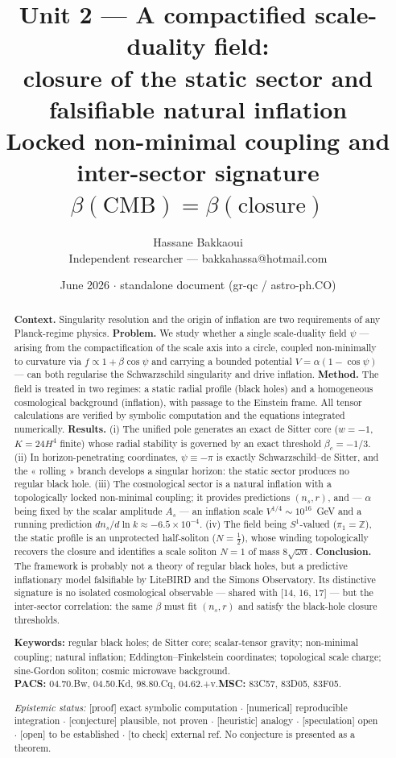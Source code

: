\documentclass[11pt,a4paper]{article}
\title{\vspace{-1.0cm}\textbf{Unit 2 --- A compactified scale-duality field:\\
closure of the static sector and falsifiable natural inflation}\\[5pt]
\large Locked non-minimal coupling and inter-sector signature $\beta(\mathrm{CMB})=\beta(\text{closure})$}
\author{Hassane Bakkaoui\\ \small Independent researcher --- bakkahassa@hotmail.com}
\date{\small June 2026 $\cdot$ standalone document (gr-qc / astro-ph.CO)}
\newcommand{\statut}[1]{{\footnotesize\textsf{[#1]}}}
\theoremstyle{plain}
\theoremstyle{remark}
\begin{document}
\maketitle

\begin{abstract}
\noindent
\textbf{Context.} Singularity resolution and the origin of inflation are two requirements
of any Planck-regime physics. \textbf{Problem.} We study whether a single scale-duality
field $\psi$ --- arising from the compactification of the scale axis into a circle, coupled
non-minimally to curvature via $f\propto1+\beta\cos\psi$ and carrying a bounded potential
$V=\alpha(1-\cos\psi)$ --- can both regularise the Schwarzschild singularity and drive
inflation. \textbf{Method.} The field is treated in two regimes: a static radial profile
(black holes) and a homogeneous cosmological background (inflation), with passage to the
Einstein frame. All tensor calculations are verified by symbolic computation and the
equations integrated numerically. \textbf{Results.} (i) The unified pole generates an exact
de Sitter core ($w=-1$, $K=24H^4$ finite) whose radial stability is governed by an exact
threshold $\beta_c=-1/3$. (ii) In horizon-penetrating coordinates, $\psi\equiv-\pi$ is
exactly Schwarzschild--de Sitter, and the « rolling » branch develops a singular horizon:
the static sector produces no regular black hole. (iii) The cosmological sector is a natural
inflation with a topologically locked non-minimal coupling; it provides predictions
$(n_s,r)$, and --- $\alpha$ being fixed by the scalar amplitude $A_s$ --- an inflation scale
$V^{1/4}\sim10^{16}$~GeV and a running prediction $dn_s/d\ln k\approx-6.5\times10^{-4}$.
(iv) The field being $S^1$-valued ($\pi_1=\mathbb{Z}$), the static profile is an unprotected
half-soliton ($N=\tfrac12$), whose winding topologically recovers the closure and identifies
a scale soliton $N=1$ of mass $8\sqrt{\omega\alpha}$. \textbf{Conclusion.} The framework is
probably not a theory of regular black holes, but a predictive inflationary model
falsifiable by LiteBIRD and the Simons Observatory. Its distinctive signature is no isolated
cosmological observable --- shared with [14, 16, 17] --- but the inter-sector correlation:
the same $\beta$ must fit $(n_s,r)$ and satisfy the black-hole closure thresholds.

\smallskip\noindent\textbf{Keywords:} regular black holes; de Sitter core; scalar-tensor
gravity; non-minimal coupling; natural inflation; Eddington--Finkelstein coordinates;
topological scale charge; sine-Gordon soliton; cosmic microwave background.\\
\textbf{PACS:} 04.70.Bw, 04.50.Kd, 98.80.Cq, 04.62.+v.\quad\textbf{MSC:} 83C57, 83D05, 83F05.

\smallskip\noindent\textit{Epistemic status:} \statut{proof} exact symbolic computation $\cdot$
\statut{numerical} reproducible integration $\cdot$ \statut{conjecture} plausible, not proven $\cdot$
\statut{heuristic} analogy $\cdot$ \statut{speculation} open $\cdot$ \statut{open} to be
established $\cdot$ \statut{to check} external ref. No conjecture is presented as a theorem.
\end{abstract}
\end{document}
